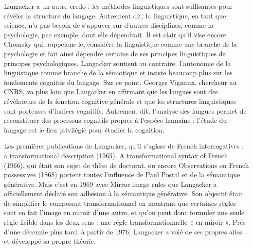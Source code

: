 Langacker a un autre credo : les méthodes linguistiques sont suffisantes pour révéler la structure du langage. Autrement dit, la linguistique, en tant que science, n’a pas besoin de s'appuyer sur d’autres disciplines, comme la psychologie, par exemple, dont elle dépendrait. Il est clair qu’il vise encore Chomsky qui, rappelons-le, considère la linguistique comme une branche de la psychologie et fait ainsi dépendre certains de ses principes linguistiques de principes psychologiques. Langacker soutient au contraire. l'autonomie de la linguistique comme branche de la sémiotique et insiste beaucoup plus sur les fondements cognitifs du langage. Sur ce point, Georges Vignaux, chercheur au CNRS, va plus loin que Langacker en affirmant que les langues sont des révélateurs de la fonction cognitive générale et que les structures linguistiques sont porteuses d'indices cognitifs. Autrement dit, l'analyse des langues permet de reconstituer des processus cognitifs propres à l’espèce humaine : l’étude du langage est le lieu privilégié pour étudier la cognition.\par

\par

Les premières publications de Langacker, qu’il s’agisse de French interrogatives : a transformational description (1965), A transformational syntax of French (1966), qui était son sujet de thèse de doctorat, ou encore Observations on French possessives (1868) portent toutes l'influence de Paul Postal et de la sémantique générative. Mais c’est en 1969 avec Mirror image rules que Langacker a officiellement déclaré son adhésion à la sémantique générative. Son objectif était de simplifier le composant transformationnel en montrant que certaines règles sont en fait l’image en miroir d’une autre, et qu’on peut donc formuler une seule règle lisible dans les deux sens : une règle transformationnelle « en miroir ». Près d’une décennie plus tard, à partir de 1976, Langacker a volé de ses propres ailes et développé sa propre théorie.\par


\par


